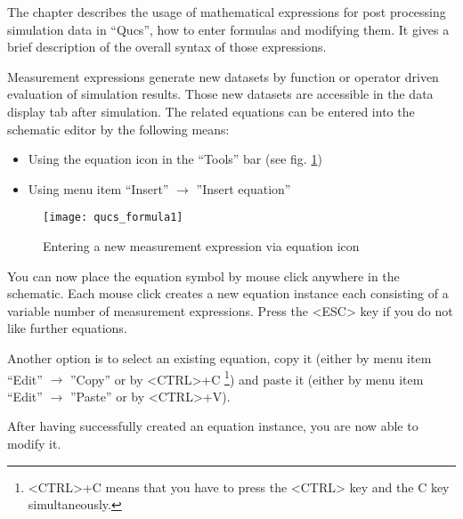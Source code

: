 \providecommand{\boldsymbol}[1]{\mbox{\boldmath $#1$}}

\providecommand{\tabularnewline}{\\}

The chapter describes the usage of mathematical expressions for post
processing simulation data in ``Qucs'', how to enter formulas and
modifying them.  It gives a brief description of the overall syntax of
those expressions.


Measurement expressions generate new datasets by function or operator
driven evaluation of simulation results. Those new datasets are
accessible in the data display tab after simulation. The related
equations can be entered into the schematic editor by the following
means:

\begin{itemize}
\item Using the equation icon in the {}``Tools'' bar (see fig. \ref{cap:Entering})
\item Using menu item {}``Insert'' $\rightarrow$ ''Insert equation''
\end{itemize}
%
\begin{figure}[ht]
\begin{center}\texttt{[image: qucs\_formula1]}\end{center}


\caption{\label{cap:Entering}Entering a new measurement expression via equation
icon}
\end{figure}


You can now place the equation symbol by mouse click anywhere
in the schematic. Each mouse click creates a new equation instance
each consisting of a variable number of measurement expressions.
Press the <ESC> key if you do not like further equations.

Another option is to select an existing equation, copy it (either
by menu item {}``Edit'' $\rightarrow$ ''Copy'' or by <CTRL>+C%
\footnote{<CTRL>+C means that you have to press the <CTRL> key and the C key
simultaneously.%
}) and paste it (either by menu item {}``Edit'' $\rightarrow$ ''Paste'' or
by <CTRL>+V).

After having successfully created an equation instance, you are now
able to modify it.



